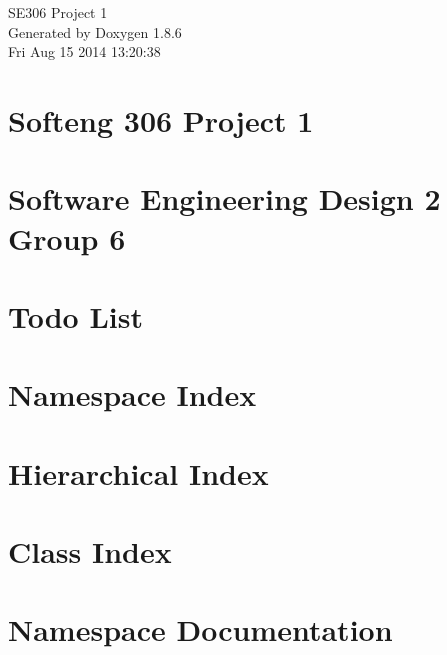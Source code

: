 \documentclass[twoside]{book}
\newcommand{\clearemptydoublepage}{%
  \newpage{\pagestyle{empty}\cleardoublepage}%
}
\begin{document}
\hypersetup{pageanchor=false}
\begin{titlepage}
\vspace*{7cm}
\begin{center}%
{\Large S\-E306 Project 1 }\\
\vspace*{1cm}
{\large Generated by Doxygen 1.8.6}\\
\vspace*{0.5cm}
{\small Fri Aug 15 2014 13:20:38}\\
\end{center}
\end{titlepage}
\clearemptydoublepage
\tableofcontents
\clearemptydoublepage
{}
\hypersetup{pageanchor=true}

\chapter{Softeng 306 Project 1}
\label{index}\hypertarget{index}{}
\chapter{Software Engineering Design 2 Group 6}
\label{md_README}
\hypertarget{md_README}{}

\chapter{Todo List}
\label{todo}
\hypertarget{todo}{}

\chapter{Namespace Index}

\chapter{Hierarchical Index}

\chapter{Class Index}

\chapter{Namespace Documentation}



\end{document}
